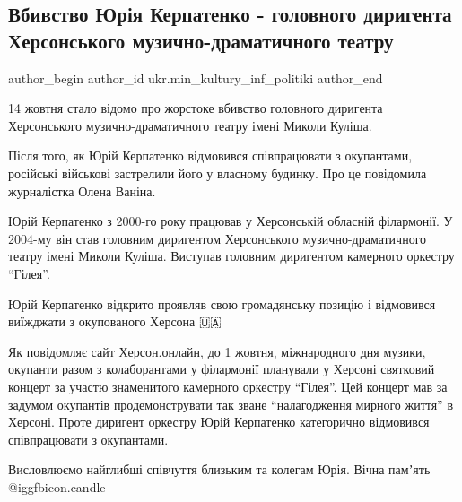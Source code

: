  
 
 
 
 
 
\subsection{Вбивство Юрія Керпатенко - головного диригента Херсонського музично-драматичного театру}
\label{sec:15_10_2022.fb.ukr.min_kultury_inf_politiki.1.kerpatenko_murder}
 
\ifcmt
 author_begin
   author_id ukr.min_kultury_inf_politiki
 author_end
\fi

14 жовтня стало відомо про жорстоке вбивство головного диригента Херсонського
музично-драматичного театру імені Миколи Куліша. 

Після того, як Юрій Керпатенко відмовився співпрацювати з окупантами, російські
військові застрелили його у власному будинку. Про це повідомила журналістка
Олена Ваніна.

Юрій Керпатенко з 2000-го року працював у Херсонській обласній філармонії. У
2004-му він став головним диригентом Херсонського музично-драматичного театру
імені Миколи Куліша. Виступав головним диригентом камерного оркестру \enquote{Гілея}. 

Юрій Керпатенко відкрито проявляв свою громадянську позицію і відмовився
виїжджати з окупованого Херсона 🇺🇦

Як повідомляє сайт Херсон.онлайн, до 1 жовтня, міжнародного дня музики,
окупанти разом з колаборантами у філармонії планували у Херсоні святковий
концерт за участю знаменитого камерного оркестру \enquote{Гілея}. Цей концерт мав за
задумом окупантів продемонструвати так зване \enquote{налагодження мирного життя} в
Херсоні. Проте диригент оркестру Юрій Керпатенко категорично відмовився
співпрацювати з окупантами. 

Висловлюємо найглибші співчуття близьким та колегам Юрія. Вічна памʼять @igg{fbicon.candle} 
